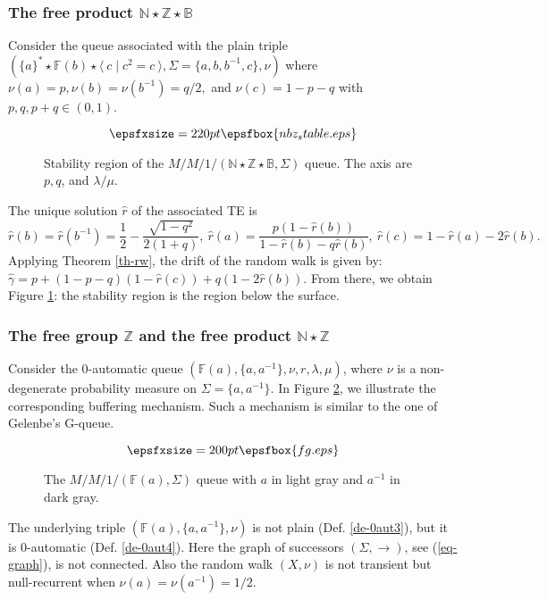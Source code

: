 \documentclass[11pt,a4paper]{article}
\theoremstyle{remark}
\def\Blackboardfont{\mathbb}
\newcommand{\pres}[2]{\langle \: #1 \mid #2 \: \rangle}
\def\B{{\Blackboardfont B}}
\def\F{{\Blackboardfont F}}
\def\Z{{\Blackboardfont Z}}
\def\N{{\Blackboardfont N}}
\def\eref#1{(\ref{#1})}
\begin{document}
\subsubsection{The free product $\N \star \Z \star \B$}

Consider the queue associated with the plain triple $(\{a\}^*\star
\F(b)\star \pres{c}{c^2=c}, \Sigma=\{a,b,b^{-1},c\}, \nu)$ where
$\nu(a)=p, \nu(b)=\nu(b^{-1})=q/2, $ and $\nu(c) =1-p-q$ with
$p,q, p+q \in (0,1)$.

\begin{figure}[ht]
\[ \epsfxsize=220pt \epsfbox{nbz_stable.eps} \]
\caption{Stability region of the $M/M/1/(\N\star\Z\star
  \B,\Sigma)$ queue. The axis are $p,q$, and $\lambda/\mu$. }
\label{f-n-z-b}
\end{figure}

The unique solution $\widehat{r}$ of the associated TE is
$$\widehat{r}(b)=\widehat{r}(b^{-1})=\frac{1}{2}-\frac{\sqrt{1-q^2}}{2(1+q)},
\
\widehat{r}(a)=\frac{p(1-\widehat{r}(b))}{1-\widehat{r}(b)-q\widehat{r}(b)},
\ \widehat{r}(c)=1-\widehat{r}(a)-2\widehat{r}(b).$$ Applying
Theorem \ref{th-rw}, the drift of the random walk is given by:
$\widehat{\gamma}=p+(1-p-q)(1-\widehat{r}(c))+q(1-2\widehat{r}(b))$.
From there, we obtain Figure \ref{f-n-z-b}: the stability region
is the region below the surface.

\subsubsection{The free group $\Z$ and the free product $\N \star \Z$}\label{ssse-fg}

Consider the 0-automatic queue
$(\F(a),\{a,a^{-1}\},\nu,r,\lambda,\mu)$, where $\nu$ is a
non-degenerate probability measure on $\Sigma=\{a,a^{-1}\}$. In
Figure \ref{fi-fg}, we illustrate the corresponding buffering
mechanism. Such a mechanism is similar to the one of Gelenbe's
G-queue. 

\begin{figure}[ht]
\[ \epsfxsize=200pt \epsfbox{fg.eps} \]
\caption{The $M/M/1/(\F(a),\Sigma)$ queue with $a$ in light gray
  and $a^{-1}$ in dark gray.}
\label{fi-fg}
\end{figure}

The underlying triple $(\F(a),\{a,a^{-1}\},\nu)$ is not plain
(Def. \ref{de-0aut3}), but it is 0-automatic (Def. \ref{de-0aut4}). 
Here the graph of successors $(\Sigma,\rightarrow)$, see
\eref{eq-graph}, is not connected. Also the random walk $(X,\nu)$ is
not transient but null-recurrent when $\nu(a)=\nu(a^{-1})=1/2$.
\end{document}
